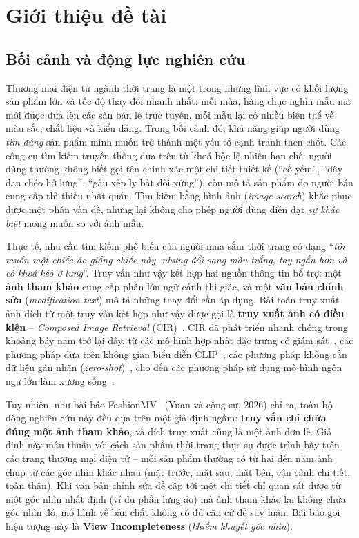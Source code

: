 \chapter{Giới thiệu đề tài}\label{chapter:introduction}
\pagestyle{fancy}

\section{Bối cảnh và động lực nghiên cứu}

Thương mại điện tử ngành thời trang là một trong những lĩnh vực có khối lượng sản phẩm lớn và tốc độ thay đổi nhanh nhất: mỗi mùa, hàng chục nghìn mẫu mã mới được đưa lên các sàn bán lẻ trực tuyến, mỗi mẫu lại có nhiều biến thể về màu sắc, chất liệu và kiểu dáng. Trong bối cảnh đó, khả năng giúp người dùng \emph{tìm đúng} sản phẩm mình muốn trở thành một yếu tố cạnh tranh then chốt. Các công cụ tìm kiếm truyền thống dựa trên từ khoá bộc lộ nhiều hạn chế: người dùng thường không biết gọi tên chính xác một chi tiết thiết kế (``cổ yếm'', ``dây đan chéo hở lưng'', ``gấu xếp ly bất đối xứng''), còn mô tả sản phẩm do người bán cung cấp thì thiếu nhất quán. Tìm kiếm bằng hình ảnh (\emph{image search}) khắc phục được một phần vấn đề, nhưng lại không cho phép người dùng diễn đạt \emph{sự khác biệt} mong muốn so với ảnh mẫu.

Thực tế, nhu cầu tìm kiếm phổ biến của người mua sắm thời trang có dạng ``\emph{tôi muốn một chiếc áo giống chiếc này, nhưng đổi sang màu trắng, tay ngắn hơn và có khoá kéo ở lưng}''. Truy vấn như vậy kết hợp hai nguồn thông tin bổ trợ: một \textbf{ảnh tham khảo} cung cấp phần lớn ngữ cảnh thị giác, và một \textbf{văn bản chỉnh sửa} (\emph{modification text}) mô tả những thay đổi cần áp dụng. Bài toán truy xuất ảnh đích từ một truy vấn kết hợp như vậy được gọi là \textbf{truy xuất ảnh có điều kiện} -- \emph{Composed Image Retrieval} (CIR)~\cite{vo2019tirg}. CIR đã phát triển nhanh chóng trong khoảng bảy năm trở lại đây, từ các mô hình hợp nhất đặc trưng có giám sát~\cite{vo2019tirg,anwaar2021composeae}, các phương pháp dựa trên không gian biểu diễn CLIP~\cite{baldrati2022clip4cir,bai2024sprc}, các phương pháp không cần dữ liệu gán nhãn (\emph{zero-shot})~\cite{saito2023pic2word,baldrati2023searle,gu2024lincir}, cho đến các phương pháp sử dụng mô hình ngôn ngữ lớn làm xương sống~\cite{huynh2025collm}.

Tuy nhiên, như bài báo FashionMV~\cite{yuan2026fashionmv} (Yuan và cộng sự, 2026) chỉ ra, toàn bộ dòng nghiên cứu này đều dựa trên một giả định ngầm: \textbf{truy vấn chỉ chứa đúng một ảnh tham khảo}, và đích truy xuất cũng là một ảnh đơn lẻ. Giả định này mâu thuẫn với cách sản phẩm thời trang thực sự được trình bày trên các trang thương mại điện tử -- mỗi sản phẩm thường có từ hai đến năm ảnh chụp từ các góc nhìn khác nhau (mặt trước, mặt sau, mặt bên, cận cảnh chi tiết, toàn thân). Khi văn bản chỉnh sửa đề cập tới một chi tiết chỉ quan sát được từ một góc nhìn nhất định (ví dụ phần lưng áo) mà ảnh tham khảo lại không chứa góc nhìn đó, mô hình về bản chất không có đủ căn cứ để suy luận. Bài báo gọi hiện tượng này là \textbf{View Incompleteness} (\emph{khiếm khuyết góc nhìn}).

